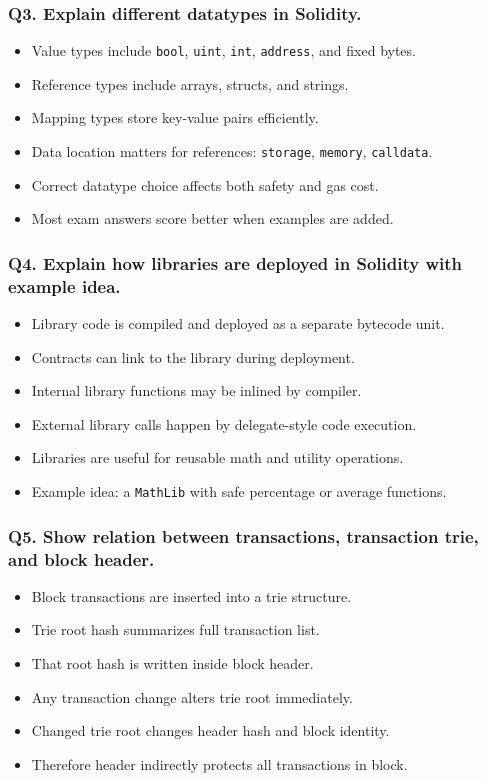 \documentclass[12pt,a4paper]{article}
\begin{document}
\subsubsection*{Q3. Explain different datatypes in Solidity.}
\begin{itemize}
\item Value types include \texttt{bool}, \texttt{uint}, \texttt{int}, \texttt{address}, and fixed bytes.
\item Reference types include arrays, structs, and strings.
\item Mapping types store key-value pairs efficiently.
\item Data location matters for references: \texttt{storage}, \texttt{memory}, \texttt{calldata}.
\item Correct datatype choice affects both safety and gas cost.
\item Most exam answers score better when examples are added.
\end{itemize}

\subsubsection*{Q4. Explain how libraries are deployed in Solidity with example idea.}
\begin{itemize}
\item Library code is compiled and deployed as a separate bytecode unit.
\item Contracts can link to the library during deployment.
\item Internal library functions may be inlined by compiler.
\item External library calls happen by delegate-style code execution.
\item Libraries are useful for reusable math and utility operations.
\item Example idea: a \texttt{MathLib} with safe percentage or average functions.
\end{itemize}

\subsubsection*{Q5. Show relation between transactions, transaction trie, and block header.}
\begin{itemize}
\item Block transactions are inserted into a trie structure.
\item Trie root hash summarizes full transaction list.
\item That root hash is written inside block header.
\item Any transaction change alters trie root immediately.
\item Changed trie root changes header hash and block identity.
\item Therefore header indirectly protects all transactions in block.
\end{itemize}
\end{document}
